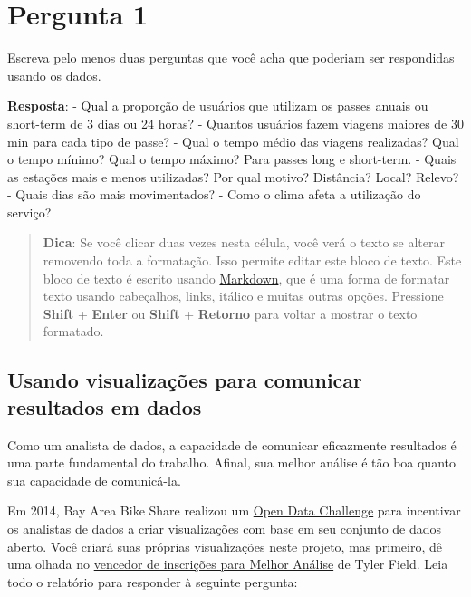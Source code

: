 \documentclass[11pt]{article}
\begin{document}
    \section{Pergunta 1}\label{pergunta-1}

Escreva pelo menos duas perguntas que você acha que poderiam ser
respondidas usando os dados.

    \textbf{Resposta}: - Qual a proporção de usuários que utilizam os passes
anuais ou short-term de 3 dias ou 24 horas? - Quantos usuários fazem
viagens maiores de 30 min para cada tipo de passe? - Qual o tempo médio
das viagens realizadas? Qual o tempo mínimo? Qual o tempo máximo? Para
passes long e short-term. - Quais as estações mais e menos utilizadas?
Por qual motivo? Distância? Local? Relevo? - Quais dias são mais
movimentados? - Como o clima afeta a utilização do serviço?

\begin{quote}
\textbf{Dica}: Se você clicar duas vezes nesta célula, você verá o texto
se alterar removendo toda a formatação. Isso permite editar este bloco
de texto. Este bloco de texto é escrito usando
\href{http://daringfireball.net/projects/markdown/syntax}{Markdown}, que
é uma forma de formatar texto usando cabeçalhos, links, itálico e muitas
outras opções. Pressione \textbf{Shift} + \textbf{Enter} ou
\textbf{Shift} + \textbf{Retorno} para voltar a mostrar o texto
formatado.
\end{quote}

    \subsection{Usando visualizações para comunicar resultados em
dados}\label{usando-visualizauxe7uxf5es-para-comunicar-resultados-em-dados}

Como um analista de dados, a capacidade de comunicar eficazmente
resultados é uma parte fundamental do trabalho. Afinal, sua melhor
análise é tão boa quanto sua capacidade de comunicá-la.

Em 2014, Bay Area Bike Share realizou um
\href{http://www.bayareabikeshare.com/datachallenge-2014}{Open Data
Challenge} para incentivar os analistas de dados a criar visualizações
com base em seu conjunto de dados aberto. Você criará suas próprias
visualizações neste projeto, mas primeiro, dê uma olhada no
\href{http://thfield.github.io/babs/index.html}{vencedor de inscrições
para Melhor Análise} de Tyler Field. Leia todo o relatório para
responder à seguinte pergunta:
\end{document}
